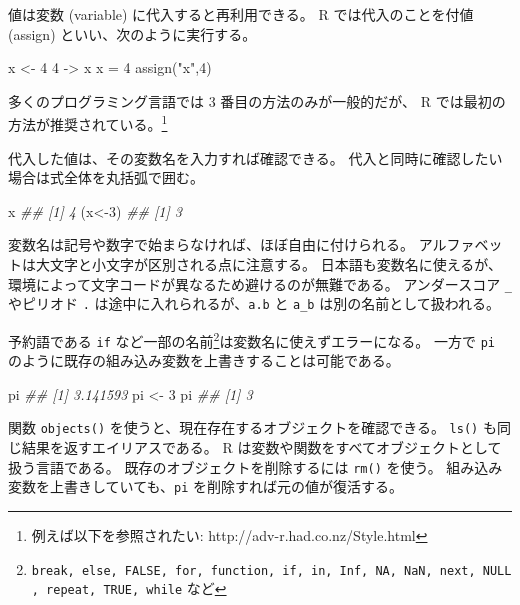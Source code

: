 \documentclass[
  letterpaper,
  xelatex,
  ja=standard, xelatex]{bxjsbook}
\newenvironment{Shaded}{\begin{snugshade}}{\end{snugshade}}
\newcommand{\DecValTok}[1]{\textcolor[rgb]{0.68,0.00,0.00}{#1}}
\newcommand{\DocumentationTok}[1]{\textcolor[rgb]{0.37,0.37,0.37}{\textit{#1}}}
\newcommand{\FunctionTok}[1]{\textcolor[rgb]{0.28,0.35,0.67}{#1}}
\newcommand{\NormalTok}[1]{\textcolor[rgb]{0.00,0.23,0.31}{#1}}
\newcommand{\OtherTok}[1]{\textcolor[rgb]{0.00,0.23,0.31}{#1}}
\newcommand{\StringTok}[1]{\textcolor[rgb]{0.13,0.47,0.30}{#1}}
\begin{document}
値は変数 (variable) に代入すると再利用できる。 R では代入のことを付値
(assign) といい、次のように実行する。

\begin{Shaded}
\begin{Highlighting}[]
\NormalTok{x }\OtherTok{\textless{}{-}} \DecValTok{4} 
\DecValTok{4} \OtherTok{{-}\textgreater{}}\NormalTok{ x}
\NormalTok{x }\OtherTok{=} \DecValTok{4}
\FunctionTok{assign}\NormalTok{(}\StringTok{"x"}\NormalTok{,}\DecValTok{4}\NormalTok{)}
\end{Highlighting}
\end{Shaded}

多くのプログラミング言語では 3 番目の方法のみが一般的だが、 R
では最初の方法が推奨されている。\footnote{ 例えば以下を参照されたい:
  http://adv-r.had.co.nz/Style.html}

代入した値は、その変数名を入力すれば確認できる。
代入と同時に確認したい場合は式全体を丸括弧で囲む。

\begin{Shaded}
\begin{Highlighting}[]
\NormalTok{x}
\DocumentationTok{\#\# [1] 4}
\NormalTok{(x}\OtherTok{\textless{}{-}}\DecValTok{3}\NormalTok{)}
\DocumentationTok{\#\# [1] 3}
\end{Highlighting}
\end{Shaded}

変数名は記号や数字で始まらなければ、ほぼ自由に付けられる。
アルファベットは大文字と小文字が区別される点に注意する。
日本語も変数名に使えるが、環境によって文字コードが異なるため避けるのが無難である。
アンダースコア \texttt{\_} やピリオド \texttt{.}
は途中に入れられるが、\texttt{a.b} と \texttt{a\_b}
は別の名前として扱われる。

予約語である \texttt{if}
など一部の名前\footnote{\texttt{break,\ else,\ FALSE,\ for,\ function,\ if,\ in,\ Inf,\ NA,\ NaN,\ next,\ NULL,\ repeat,\ TRUE,\ while}
  など}は変数名に使えずエラーになる。 一方で \texttt{pi}
のように既存の組み込み変数を上書きすることは可能である。

\begin{Shaded}
\begin{Highlighting}[]
\NormalTok{pi}
\DocumentationTok{\#\# [1] 3.141593}
\NormalTok{pi }\OtherTok{\textless{}{-}} \DecValTok{3}
\NormalTok{pi}
\DocumentationTok{\#\# [1] 3}
\end{Highlighting}
\end{Shaded}

関数 \texttt{objects()} を使うと、現在存在するオブジェクトを確認できる。
\texttt{ls()} も同じ結果を返すエイリアスである。 R
は変数や関数をすべてオブジェクトとして扱う言語である。
既存のオブジェクトを削除するには \texttt{rm()} を使う。
組み込み変数を上書きしていても、\texttt{pi}
を削除すれば元の値が復活する。
\end{document}
